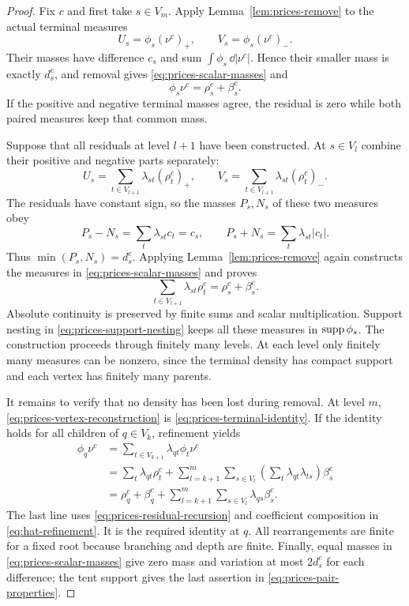 \begin{proof}
Fix $c$ and first take $s\in V_m$. Apply
Lemma~\ref{lem:prices-remove} to the actual terminal measures
\[
 U_s=\phi_s(\nu^c)_+,
 \qquad V_s=\phi_s(\nu^c)_-.
\]
Their masses have difference $c_s$ and sum
$\int\phi_s\,\dd|\nu^c|$. Hence their smaller mass is exactly
$d_s^c$, and removal gives \eqref{eq:prices-scalar-masses} and
\begin{equation}\label{eq:prices-terminal-identity}
 \phi_s\nu^c=\rho_s^c+\beta_s^c.
\end{equation}
If the positive and negative terminal masses agree, the residual
is zero while both paired measures keep that common mass.

Suppose that all residuals at level $l+1$ have been constructed.
At $s\in V_l$ combine their positive and negative parts separately:
\[
 U_s=\sum_{t\in V_{l+1}}\lambda_{st}(\rho_t^c)_+,
 \qquad
 V_s=\sum_{t\in V_{l+1}}\lambda_{st}(\rho_t^c)_-.
\]
The residuals have constant sign, so the masses $P_s,N_s$ of
these two measures obey
\[
 P_s-N_s=\sum_t\lambda_{st}c_t=c_s,
 \qquad
 P_s+N_s=\sum_t\lambda_{st}|c_t|.
\]
Thus $\min(P_s,N_s)=d_s^c$. Applying
Lemma~\ref{lem:prices-remove} again constructs the measures in
\eqref{eq:prices-scalar-masses} and proves
\begin{equation}\label{eq:prices-residual-recursion}
 \sum_{t\in V_{l+1}}\lambda_{st}\rho_t^c
      =\rho_s^c+\beta_s^c.
\end{equation}
Absolute continuity is preserved by finite sums and scalar
multiplication. Support nesting in
\eqref{eq:prices-support-nesting} keeps all these measures in
$\operatorname{supp}\phi_s$. The construction proceeds through finitely many
levels. At each level only finitely many measures can be nonzero,
since the terminal density has compact support and each vertex
has finitely many parents.

It remains to verify that no density has been lost during removal.
At level $m$, \eqref{eq:prices-vertex-reconstruction} is
\eqref{eq:prices-terminal-identity}. If the identity holds for
all children of $q\in V_k$, refinement yields
\begin{align*}
 \phi_q\nu^c
 &=\sum_{t\in V_{k+1}}\lambda_{qt}\phi_t\nu^c\\
 &=\sum_t\lambda_{qt}\rho_t^c
   +\sum_{l=k+1}^m\sum_{s\in V_l}
        \left(\sum_t\lambda_{qt}\lambda_{ts}\right)\beta_s^c\\
 &=\rho_q^c+\beta_q^c
   +\sum_{l=k+1}^m\sum_{s\in V_l}\lambda_{qs}\beta_s^c.
\end{align*}
The last line uses \eqref{eq:prices-residual-recursion} and
coefficient composition in \eqref{eq:hat-refinement}. It is the
required identity at $q$. All rearrangements are finite for a
fixed root because branching and depth are finite. Finally,
equal masses in \eqref{eq:prices-scalar-masses} give zero mass
and variation at most $2d_s^c$ for each difference; the tent
support gives the last assertion in
\eqref{eq:prices-pair-properties}.
\end{proof}


